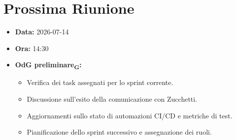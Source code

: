 \section{Prossima Riunione}
\begin{itemize}
	\item \textbf{Data:} 2026-07-14
	\item \textbf{Ora:} 14:30
	\item \textbf{OdG preliminare\textsubscript{G}:}
	\begin{itemize}
		\item Verifica dei task assegnati per lo sprint corrente.
		\item Discussione sull'esito della comunicazione con Zucchetti.
		\item Aggiornamenti sullo stato di automazioni CI/CD e metriche di test.
		\item Pianificazione dello sprint successivo e assegnazione dei ruoli.
	\end{itemize}
\end{itemize}

